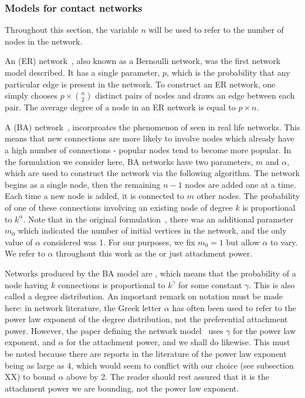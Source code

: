 \subsubsection{Models for contact networks}
\label{subsubsec:generative}

Throughout this section, the variable $n$ will be used to refer to the number
of nodes in the network. 

An  (ER) network~\autocite{erdos1960evolution}, also
known as a Bernoulli network, was the first network model described. It has a
single parameter, $p$, which is the probability that any particular edge is
present in the network. To construct an ER network, one simply chooses
$p \times \binom{n}{2}$ distinct pairs of nodes and draws an edge between each
pair. The average degree of a node in an ER network is equal to $p \times n$.

A  (BA) network~\autocite{barabasi1999emergence},
incorproates the phenomenon of  seen in real life
networks. This means that new connections are more likely to involve nodes
which already have a high number of connections - popular nodes tend to become
more popular. In the formulation we consider here, BA networks have two
parameters, $m$ and $\alpha$, which are used to construct the network via the
following algorithm. The network begins as a single node, then the remaining
$n-1$ nodes are added one at a time. Each time a new node is added, it is
connected to $m$ other nodes. The probability of one of these connections
involving an existing node of degree $k$ is proportional to $k^\alpha$. Note
that in the original formulation~\autocite{barabasi1999emergence}, there was an
additional parameter $m_0$ which indicated the number of initial vertices in
the network, and the only value of $\alpha$ considered was 1. For our purposes,
we fix $m_0 = 1$ but allow $\alpha$ to vary. We refer to $\alpha$ throughout
this work as the  or just attachment power.

Networks produced by the BA model are , which means that the
probability of a node having $k$ connections is proportional to $k^\gamma$ for
some constant $\gamma$. This is also called a  degree
distribution. An important remark on notation must be made here: in network
literature, the Greek letter $\alpha$ has often been used to refer to the power
law exponent of the degree distribution, not the preferential attachment power.
However, the paper defining the network model~\autocite{barabasi1999emergence}
uses $\gamma$ for the power law exponent, and $\alpha$ for the attachment
power, and we shall do likewise. This must be noted because there are reports
in the literature of the power law exponent being as large as 4, which would
seem to conflict with our choice (see subsection XX) to bound $\alpha$ above by
2. The reader should rest assured that it is the attachment power we are
bounding, not the power law exponent.

